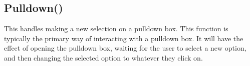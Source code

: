 \documentclass[letterpaper,10pt,english]{sphinxmanual}
\begin{document}
\begin{sphinxVerbatim}[commandchars=\\\{\}]
\PYG{p}{[}\PYG{p}{]}\PYG{p}{[}\PYG{p}{]}
\PYG{p}{[}\PYG{p}{]}
\PYG{p}{[}\PYG{p}{]}
\end{sphinxVerbatim}

\sphinxAtStartPar
{}

\sphinxAtStartPar
{}

\ignorespaces 

\subsection{Pulldown()}
\label{\detokenize{reference/ui:pulldown}}\label{\detokenize{reference/ui:index-26}}
\sphinxAtStartPar
{}

\sphinxAtStartPar
{}

\sphinxAtStartPar
This handles making a new selection on a pulldown box. This function is typically the primary way of interacting with a pulldown box. It will have the effect of opening the pulldown box, waiting for the user to select a new option, and then changing the selected option to whatever they click on.

\sphinxAtStartPar
{}

\begin{sphinxVerbatim}[commandchars=\\\{\}]
\PYG{p}{[}\PYG{p}{]}
\end{sphinxVerbatim}

\sphinxAtStartPar
{}
\end{document}
